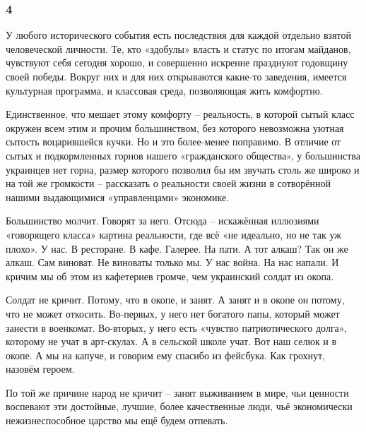  
 
 
 
 
\subsubsection{4}

У любого исторического события есть последствия для каждой отдельно взятой
человеческой личности. Те, кто «здобулы» власть и статус по итогам майданов,
чувствуют себя сегодня хорошо, и совершенно искренне празднуют годовщину своей
победы. Вокруг них и для них открываются какие-то заведения, имеется культурная
программа, и классовая среда, позволяющая жить комфортно.

Единственное, что мешает этому комфорту – реальность, в которой сытый класс
окружен всем этим  и прочим большинством, без
которого невозможна уютная сытость воцарившейся кучки. Но и это более-менее
поправимо. В отличие от сытых и подкормленных горнов нашего «гражданского
общества», у большинства украинцев нет горна, размер которого позволил бы им
звучать столь же широко и на той же громкости – рассказать о реальности своей
жизни в сотворённой нашими выдающимися «управленцами» экономике.

Большинство молчит. Говорят за него. Отсюда – искажённая иллюзиями «говорящего
класса» картина реальности, где всё «не идеально, но не так уж плохо». У нас. В
ресторане. В кафе. Галерее. На пати. А тот алкаш? Так он же алкаш. Сам виноват.
Не виноваты только мы. У нас война. На нас напали. И кричим мы об этом из
кафетериев громче, чем украинский солдат из окопа.

Солдат не кричит. Потому, что в окопе, и занят. А занят и в окопе он потому,
что не может откосить. Во-первых, у него нет богатого папы, который может
занести в военкомат. Во-вторых, у него есть «чувство патриотического долга»,
которому не учат в арт-скулах. А в сельской школе учат. Вот наш селюк и в
окопе. А мы на капуче, и говорим ему спасибо из фейсбука. Как грохнут, назовём
героем.  

По той же причине народ не кричит – занят выживанием в мире, чьи ценности
воспевают эти достойные, лучшие, более качественные люди, чьё экономически
нежизнеспособное царство мы ещё будем отпевать.
